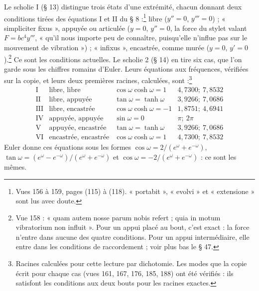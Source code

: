 \documentclass[11pt,a4paper]{article}
\begin{document}
Le scholie I (§ 13) distingue trois états d'une extrémité, chacun donnant deux conditions tirées des équations I et II du § 8 :\footnote{Vues 156 à 159, pages (115) à (118). « portabit », « evolvi » et « extensione » sont lus avec doute.} libre ($y''=0$, $y'''=0$) ; « simpliciter fixus », appuyée ou articulée ($y=0$, $y''=0$, la force du stylet valant $F=bc^4y'''$, « qu'il nous importe peu de connaître, puisqu'elle n'influe pas sur le mouvement de vibration ») ; « infixus », encastrée, comme murée ($y=0$, $y'=0$).\footnote{Vue 158 : « quam autem nosse parum nobis refert ; quia in motum vibratorium non influit ». Pour un appui placé au bout, c'est exact : la force n'entre dans aucune des quatre conditions. Pour un appui intermédiaire, elle entre dans les conditions de raccordement ; voir plus bas le § 47.} Ce sont les conditions actuelles. Le scholie 2 (§ 14) en tire six cas, que l'on garde sous les chiffres romains d'Euler. Leurs équations aux fréquences, vérifiées sur la copie, et leurs deux premières racines, calculées, sont :\footnote{Racines calculées pour cette lecture par dichotomie. Les modes que la copie écrit pour chaque cas (vues 161, 167, 176, 185, 188) ont été vérifiés : ils satisfont les conditions aux deux bouts pour les racines exactes.}
\[
\begin{array}{llll}
\text{I} & \text{libre, libre} & \cos\omega\cosh\omega=1 & 4{,}7300 ;\ 7{,}8532\\
\text{II} & \text{libre, appuyée} & \tan\omega=\tanh\omega & 3{,}9266 ;\ 7{,}0686\\
\text{III} & \text{libre, encastrée} & \cos\omega\cosh\omega=-1 & 1{,}8751 ;\ 4{,}6941\\
\text{IV} & \text{appuyée, appuyée} & \sin\omega=0 & \pi ;\ 2\pi\\
\text{V} & \text{appuyée, encastrée} & \tan\omega=\tanh\omega & 3{,}9266 ;\ 7{,}0686\\
\text{VI} & \text{encastrée, encastrée} & \cos\omega\cosh\omega=1 & 4{,}7300 ;\ 7{,}8532
\end{array}
\]
Euler donne ces équations sous les formes $\cos\omega=2/(e^\omega+e^{-\omega})$, $\tan\omega=(e^\omega-e^{-\omega})/(e^\omega+e^{-\omega})$ et $\cos\omega=-2/(e^\omega+e^{-\omega})$ : ce sont les mêmes.
\end{document}
